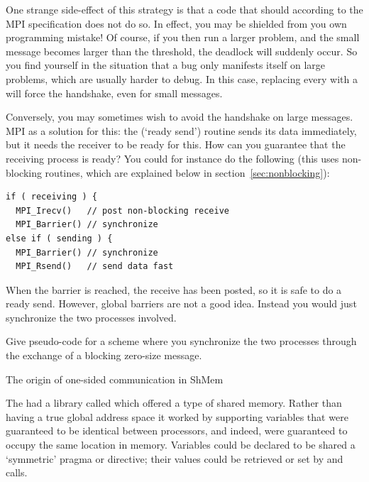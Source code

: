 
One strange side-effect of this strategy is that a code that
should  according to the MPI specification does
not do so. In effect, you may be shielded from you own programming
mistake! Of course, if you then run a larger problem, and the small
message becomes larger than the threshold, the deadlock will suddenly
occur. So you find yourself in the situation that a bug only manifests
itself on large problems, which are usually harder to debug. In this
case, replacing every  with a  will force the
handshake, even for small messages.

Conversely, you may sometimes wish to avoid the handshake on large
messages. MPI as a solution for this: the  (`ready
send') routine sends its data immediately, but it needs the receiver
to be ready for this. How can you guarantee that the receiving process
is ready? You could for instance do the following (this uses
non-blocking routines, which are explained below in
section~\ref{sec:nonblocking}):
\begin{verbatim}
if ( receiving ) {
  MPI_Irecv()   // post non-blocking receive
  MPI_Barrier() // synchronize
else if ( sending ) {
  MPI_Barrier() // synchronize
  MPI_Rsend()   // send data fast
\end{verbatim}
When the barrier is reached, the receive has been posted, so it is safe 
to do a ready send. However, global barriers are not a good idea.
Instead you would just synchronize the two processes involved.
\begin{exercise}
  Give pseudo-code for a scheme where you synchronize the two
  processes through the exchange of a blocking zero-size message.
\end{exercise}

 {The origin of one-sided communication in ShMem}

The  had a library called 
which offered a type of shared memory. Rather than having a true
global address space it worked by supporting variables that were
guaranteed to be identical between processors, and indeed, were
guaranteed to occupy the same location in memory. Variables could be
declared to be shared a `symmetric' pragma or directive; their values
could be retrieved or set by  and  calls.

